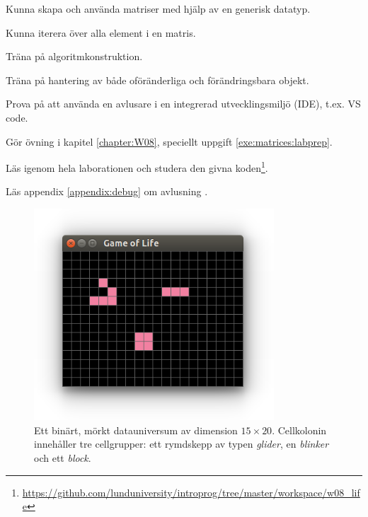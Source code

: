 
\Lab{\LabWeekEIGHT}

\begin{Goals}
\item Kunna skapa och använda matriser med hjälp av en generisk datatyp.
\item Kunna iterera över alla element i en matris.
\item Träna på algoritmkonstruktion.
\item Träna på hantering av både oföränderliga och förändringsbara objekt.
\item Prova på att använda en avlusare  i en integrerad utvecklingsmiljö (IDE), t.ex. VS code.
\end{Goals}

\begin{Preparations}
\item Gör övning {\tt \ExeWeekEIGHT} i kapitel \ref{chapter:W08}, speciellt uppgift \ref{exe:matrices:labprep}.

\item Läs igenom hela laborationen och studera den givna koden\footnote{\url{https://github.com/lunduniversity/introprog/tree/master/workspace/w08_life}}.
\item Läs appendix \ref{appendix:debug} om avlusning .

\end{Preparations}


\begin{figure}[H]
  \includegraphics[width=0.8\textwidth]{../img/glider-blinker-block}

  \vspace{-2em}\caption{\label{lab:life:glider-blinker-block}Ett binärt, mörkt datauniversum av dimension $15  \times 20$. Cellkolonin innehåller tre cellgrupper: ett rymdskepp av typen \emph{glider}, en \emph{blinker} och ett \emph{block}.}
\end{figure}


